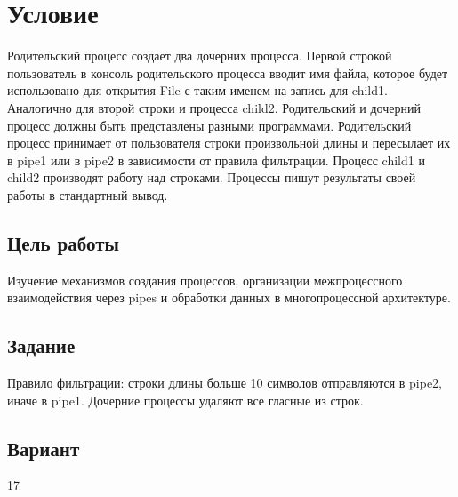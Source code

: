 \section{Условие}
Родительский процесс создает два дочерних процесса. Первой строкой пользователь в консоль родительского процесса вводит имя файла, которое будет использовано для открытия File с таким именем на запись для child1. Аналогично для второй строки и процесса child2. Родительский и дочерний процесс должны быть представлены разными программами. Родительский процесс принимает от пользователя строки произвольной длины и пересылает их в pipe1 или в pipe2 в зависимости от правила фильтрации. Процесс child1 и child2 производят работу над строками. Процессы пишут результаты своей работы в стандартный вывод.

\subsection*{Цель работы}
Изучение механизмов создания процессов, организации межпроцессного взаимодействия через pipes и обработки данных в многопроцессной архитектуре.

\subsection*{Задание}
Правило фильтрации: строки длины больше 10 символов отправляются в pipe2, иначе в pipe1. Дочерние процессы удаляют все гласные из строк.

\subsection*{Вариант} 17